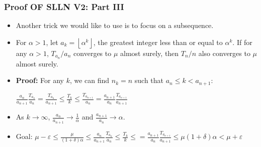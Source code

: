 \documentclass[handout]{beamer}
\newcommand{\BP}{\mathbf{P}}
\begin{document}
\frame
{
  \frametitle{Proof OF SLLN V2: Part III}

   \begin{itemize}
   \item<1-> Another trick we would like to use is to focus on a subsequence. 
       
    \item<2->[]\begin{Lemma} For $\alpha>1$, let $a_k=\left \lfloor{\alpha^k}\right \rfloor$, the greatest integer less than or equal to $\alpha^k$. If for any $\alpha>1$, $T_{a_n}/a_n$ converges to $\mu$ almost surely, then $T_n/n$ also converges to $\mu$ almost surely. \end{Lemma}
        
    \item<3-> \textbf{Proof:} For any $k$, we can find $n_k = n$ such that $a_n\leq k < a_{n+1}$:
    
    $\frac{a_n}{a_{n+1}}\frac{T_{a_n}}{a_{n}}= \frac{T_{a_n}}{a_{n+1}} \leq \frac{T_{k}}{k}\leq \frac{T_{a_{n+1}}}{a_{n}} = \frac{a_{n+1}}{a_{n}}\frac{T_{a_{n+1}}}{a_{n+1}}$
    
   
  \item<4-> [-] As $k\rightarrow \infty$, $\frac{a_n}{a_{n+1}}\rightarrow \frac{1}{\alpha}$ and $\frac{a_{n+1}}{a_{n}}\rightarrow \alpha$. 

  \item<5->[-] Goal:       $\mu - \varepsilon \le \frac{\mu}{(1+\delta)\alpha} \le \frac{a_n}{a_{n+1}}\frac{T_{a_n}}{a_{n}} \leq \frac{T_{k}}{k}\leq  = \frac{a_{n+1}}{a_{n}}\frac{T_{a_{n+1}}}{a_{n+1}} \le \mu(1+\delta)\alpha < \mu + \varepsilon$
  


%  
                                            
\end{itemize}
}
\end{document}
